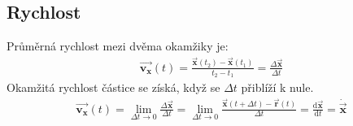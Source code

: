\documentclass[letterpaper,10pt,english]{jupyterBook}
\begin{document}
\subsection{Rychlost}
\label{\detokenize{Prednasky/1_2_Kinematika_v_1D:rychlost}}
\sphinxAtStartPar
Průměrná rychlost mezi dvěma okamžiky je:
\begin{equation*}
\begin{split}\overrightarrow{\mathbf{v_x}}(t) = \frac{\overrightarrow{\mathbf{x}}(t_2)-\overrightarrow{\mathbf{x}}(t_1)}{t_2-t_1} = \frac{\Delta \overrightarrow{\mathbf{x}}}{\Delta t}\end{split}
\end{equation*}
\sphinxAtStartPar
Okamžitá rychlost částice se získá, když se \(\Delta t\) přiblíží k nule.
\begin{equation*}
\begin{split}\overrightarrow{\mathbf{v_x}}(t) = \lim_{\Delta t \to 0} \frac{\Delta \overrightarrow{\mathbf{x}}}{\Delta t} = \lim_{\Delta t \to 0} \frac{\overrightarrow{\mathbf{x}}(t+\Delta t)-\overrightarrow{\mathbf{r}}(t)}{\Delta t} = \frac{\mathrm{d}\overrightarrow{\mathbf{x}}}{\mathrm{d}t} = \dot{\vec{\mathbf{x}}}\end{split}
\end{equation*}
\end{document}
